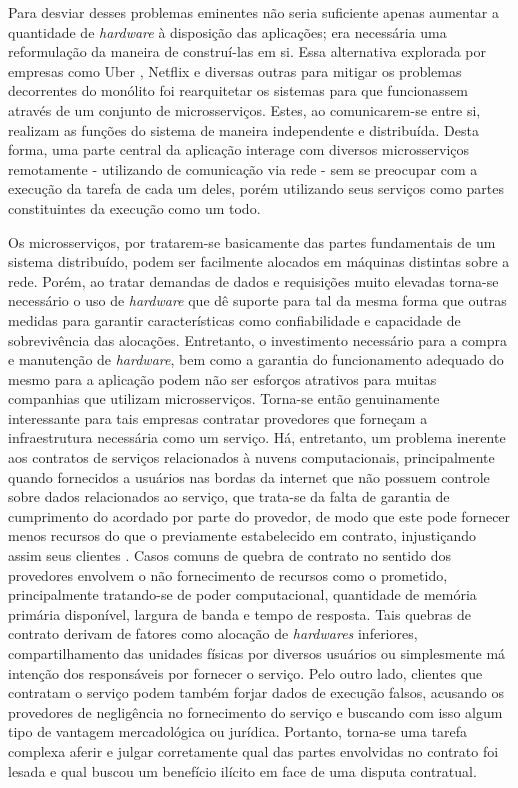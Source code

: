 %
Para desviar desses problemas eminentes não seria suficiente apenas aumentar a quantidade de \textit{hardware} à disposição das aplicações; era necessária uma reformulação da maneira de construí-las em si.
%
Essa alternativa explorada por empresas como Uber \cite{microsservicos:uber}, Netflix \cite{microsservicos:netflix} e diversas outras \cite{microsservicos:empresas} para mitigar os problemas decorrentes do monólito foi rearquitetar os sistemas para que funcionassem através de um conjunto de microsserviços.
%
Estes, ao comunicarem-se entre si, realizam as funções do sistema de maneira independente e distribuída. Desta forma, uma parte central da aplicação interage com diversos microsserviços remotamente - utilizando de comunicação via rede - sem se preocupar com a execução da tarefa de cada um deles, porém utilizando seus serviços como partes constituintes da execução como um todo.

%
Os microsserviços, por tratarem-se basicamente das partes fundamentais de um sistema distribuído, podem ser facilmente alocados em máquinas distintas sobre a rede.
%
Porém, ao tratar demandas de dados e requisições muito elevadas torna-se necessário o uso de \textit{hardware} que dê suporte para tal da mesma forma que outras medidas para garantir características como confiabilidade e capacidade de sobrevivência das alocações.
%
Entretanto, o investimento necessário para a compra e manutenção de \textit{hardware}, bem como a garantia do funcionamento adequado do mesmo para a aplicação podem não ser esforços atrativos para muitas companhias que utilizam microsserviços.
%
Torna-se então genuinamente interessante para tais empresas contratar provedores que forneçam a infraestrutura necessária como um serviço.
%
Há, entretanto, um problema inerente aos contratos de serviços relacionados à nuvens computacionais, principalmente quando fornecidos a usuários nas bordas da internet que não possuem controle sobre dados relacionados ao serviço\cite{nuvem_sla:edge_computing}, que trata-se da falta de garantia de cumprimento do acordado por parte do provedor, de modo que este pode fornecer menos recursos do que o previamente estabelecido em contrato, injustiçando assim seus clientes \cite{nuvem_sla:violacaoSLA}. Casos comuns de quebra de contrato no sentido dos provedores envolvem o não fornecimento de recursos como o prometido, principalmente tratando-se de poder computacional, quantidade de memória primária disponível, largura de banda e tempo de resposta. Tais quebras de contrato derivam de fatores como alocação de \textit{hardwares} inferiores, compartilhamento das unidades físicas por diversos usuários ou simplesmente má intenção dos responsáveis por fornecer o serviço. 
%
Pelo outro lado, clientes que contratam o serviço podem também forjar dados de execução falsos, acusando os provedores de negligência no fornecimento do serviço e buscando com isso algum tipo de vantagem mercadológica ou jurídica.
%
Portanto, torna-se uma tarefa complexa aferir e julgar corretamente qual das partes envolvidas no contrato foi lesada e qual buscou um benefício ilícito em face de uma disputa contratual.

